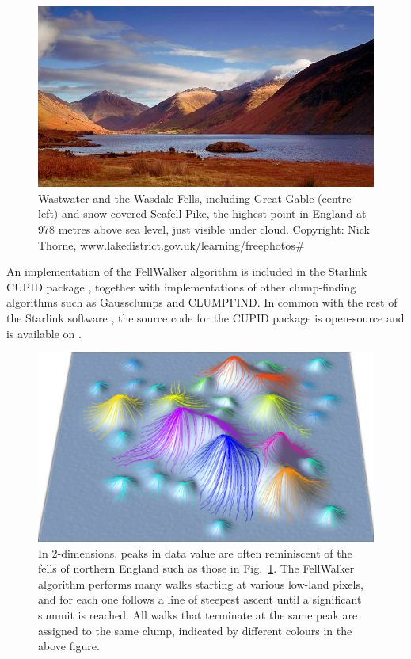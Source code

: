 \documentclass[final,authoryear,5p,times,twocolumn]{elsarticle}
\begin{document}
\begin{figure}
\includegraphics[width=\columnwidth]{wasdale}
\caption{Wastwater and the Wasdale Fells, including Great Gable
(centre-left) and snow-covered Scafell Pike, the highest point in England
at 978 metres above sea level, just visible under cloud. Copyright: Nick
Thorne, www.lakedistrict.gov.uk/learning/freephotos\# }
\label{fig:wasdale}
\end{figure}

An implementation of the FellWalker algorithm is included in the Starlink
CUPID package \citep[][]{CupidAdass,SUN255}, together with
implementations of other clump-finding algorithms such as Gaussclumps
\citep[][]{1990ApJ...356..513S} and CLUMPFIND. In common
with the rest of the Starlink software
\citep[][]{StarlinkAdass}, the source code for the CUPID
package is open-source and is available on
.

\begin{figure}
\includegraphics[width=\columnwidth]{fellwalking}
\caption{In 2-dimensions, peaks in data value are often reminiscent of the
fells of northern England such as those in Fig.~\ref{fig:wasdale}. The
FellWalker algorithm performs many walks starting at various low-land
pixels, and for each one follows a line of steepest ascent until a
significant summit is reached. All walks that terminate at the same peak
are assigned to the same clump, indicated by different colours in the
above figure.}
\label{fig:fellwalking}
\end{figure}
\end{document}
